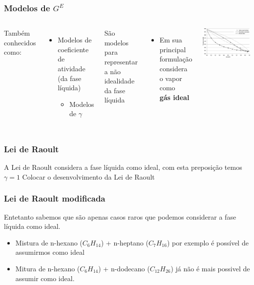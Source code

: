 \documentclass[aspectratio=169]{beamer}
\begin{document}
\begin{frame}
	\frametitle{Modelos de $G^E$}
	\begin{columns}[c]
		Também conhecidos como:
		\begin{itemize}
			\item Modelos de coeficiente de atividade (da fase líquida)
			\begin{itemize}
				\item Modelos de $\gamma$
			\end{itemize}
		\end{itemize}
		São modelos para representar a não idealidade da fase líquida
		\begin{itemize}
			\item Em sua principal formulação considera o vapor como \\
			\textbf{gás ideal}
		\end{itemize}
		\includegraphics[width=1.0\textwidth]{img/VLE_ideal.png}
	\end{columns}
\end{frame}

\begin{frame}
	\frametitle{Lei de Raoult}
	A Lei de Raoult considera a fase líquida como ideal, com esta preposição temos
	$\gamma = 1$
	Colocar o desenvolvimento da Lei de Raoult
\end{frame}

\begin{frame}
	\frametitle{Lei de Raoult modificada}
	Entetanto sabemos que são apenas casos raros que podemos considerar a fase
	líquida como ideal.
	\begin{itemize}
		\item Mistura de n-hexano ($C_{6} H_{14}$) + n-heptano ($C_{7} H_{16}$) por
		exemplo é possível de assumirmos como ideal
		\item Mitura de n-hexano ($C_{6} H_{14}$) + n-dodecano ($C_{12} H_{26}$) já
		não é mais possivel de assumir como ideal.
	\end{itemize}
\end{frame}
\end{document}
